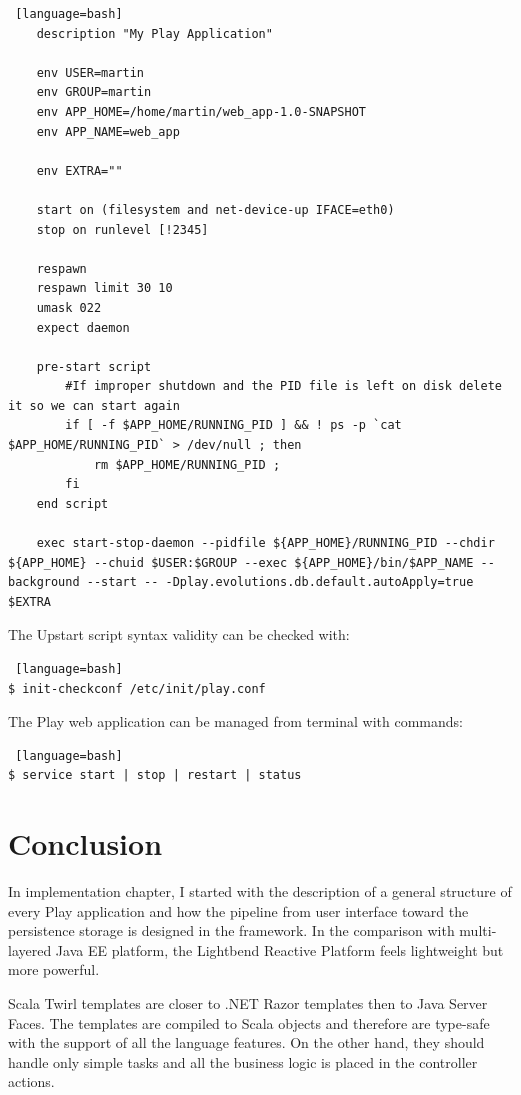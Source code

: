 \documentclass[12pt,twoside,a4paper]{report}
\begin{document}
\begin{lstlisting} [language=bash]
	description "My Play Application"

	env USER=martin
	env GROUP=martin
	env APP_HOME=/home/martin/web_app-1.0-SNAPSHOT
	env APP_NAME=web_app               
 
	env EXTRA=""
 
	start on (filesystem and net-device-up IFACE=eth0)
	stop on runlevel [!2345]
 
	respawn
	respawn limit 30 10
	umask 022
	expect daemon
 
	pre-start script
    	#If improper shutdown and the PID file is left on disk delete it so we can start again
    	if [ -f $APP_HOME/RUNNING_PID ] && ! ps -p `cat $APP_HOME/RUNNING_PID` > /dev/null ; then
        	rm $APP_HOME/RUNNING_PID ;
    	fi
	end script
 
	exec start-stop-daemon --pidfile ${APP_HOME}/RUNNING_PID --chdir ${APP_HOME} --chuid $USER:$GROUP --exec ${APP_HOME}/bin/$APP_NAME --background --start -- -Dplay.evolutions.db.default.autoApply=true $EXTRA
\end{lstlisting}
The Upstart script syntax validity can be checked with:
\begin{lstlisting} [language=bash]
$ init-checkconf /etc/init/play.conf
\end{lstlisting}
The Play web application can be managed from terminal with commands:
\begin{lstlisting} [language=bash]
$ service start | stop | restart | status
\end{lstlisting}


\section{Conclusion}\label{4.7}
In implementation chapter, I started with the description of a general structure of every Play application and how the pipeline from user interface toward the persistence storage is designed in the framework. In the comparison with multi-layered Java EE platform, the Lightbend Reactive Platform feels lightweight but more powerful.

Scala Twirl templates are closer to .NET Razor templates then to Java Server Faces. The templates are compiled to Scala objects and therefore are type-safe with the support of all the language features. On the other hand, they should handle only simple tasks and all the business logic is placed in the controller actions.
\end{document}

